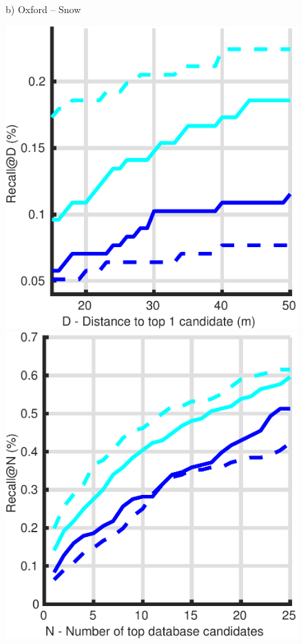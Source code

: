 \begin{figure}
\begin{minipage}{0.16\linewidth}
		b) Oxford -- Snow
	\end{minipage}
	\begin{minipage}{0.16\linewidth}
		\center \scriptsize
		\includegraphics[width=\linewidth]{plot/night_ft/Results_night_queries/distance}	
		
		\includegraphics[width=\linewidth]{plot/night_ft/Results_night_queries/recall}
		

\end{minipage}
\end{figure}
